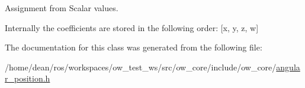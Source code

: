 Assignment from Scalar values. 

Internally the coefficients are stored in the following order\+: \mbox{[}x, y, z, w\mbox{]} 

The documentation for this class was generated from the following file\+:\begin{DoxyCompactItemize}
\item 
/home/dean/ros/workspaces/ow\+\_\+test\+\_\+ws/src/ow\+\_\+core/include/ow\+\_\+core/\hyperlink{angular__position_8h}{angular\+\_\+position.\+h}\end{DoxyCompactItemize}

